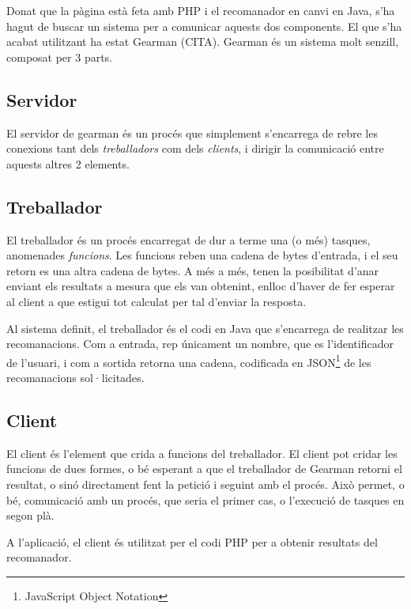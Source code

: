Donat que la pàgina està feta amb PHP i el recomanador en canvi en Java, s'ha hagut de buscar un sistema per a comunicar aquests dos components. El que s'ha acabat utilitzant ha estat Gearman (CITA). Gearman és un sistema molt senzill, composat per 3 parts.

\subsection{Servidor}

El servidor de gearman és un procés que simplement s'encarrega de rebre les conexions tant dels \emph{treballadors} com dels \emph{clients}, i dirigir la comunicació entre aquests altres 2 elements.

\subsection{Treballador}

El treballador és un procés encarregat de dur a terme una (o més) tasques, anomenades \emph{funcions}. Les funcions reben una cadena de bytes d'entrada, i el seu retorn es una altra cadena de bytes. A més a més, tenen la posibilitat d'anar enviant els resultats a mesura que els van obtenint, enlloc d'haver de fer esperar al client a que estigui tot calculat per tal d'enviar la resposta.

Al sistema definit, el treballador és el codi en Java que s'encarrega de realitzar les recomanacions. Com a entrada, rep únicament un nombre, que es l'identificador de l'usuari, i com a sortida retorna una cadena, codificada en JSON\footnote{JavaScript Object Notation} de les recomanacions sol·licitades.

\subsection{Client}

El client és l'element que crida a funcions del treballador. El client pot cridar les funcions de dues formes, o bé esperant a que el treballador de Gearman retorni el resultat, o sinó directament fent la petició i seguint amb el procés. Això permet, o bé, comunicació amb un procés, que seria el primer cas, o l'execució de tasques en segon plà.

A l'aplicació, el client és utilitzat per el codi PHP per a obtenir resultats del recomanador.